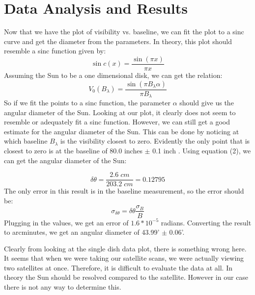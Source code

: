 \documentclass{aastex61}
\begin{document}
\section{Data Analysis and Results}
Now that we have the plot of visibility vs. baseline, we can fit the plot to a sinc curve and get the diameter from the parameters. In theory, this plot should resemble a sinc function given by:
\begin{equation}
\sin\textit{c}(x) = \frac{\sin(\pi x)}{\pi x}
\end{equation}
Assuming the Sun to be a one dimensional disk, we can get the relation:
\begin{equation}
V_{0}(B_{\lambda}) = \frac{\sin(\pi B_{\lambda} \alpha)}{\pi B_{\lambda}}
\end{equation}
So if we fit the points to a sinc function, the parameter $\alpha$ should give us the angular diameter of the Sun. Looking at our plot, it clearly does not seem to resemble or adequately fit a sinc function. However, we can still get a good estimate for the angular diameter of the Sun. This can be done by noticing at which baseline $B_{\lambda}$ is the visibility closest to zero. Evidently the only point that is closest to zero is at the baseline of 80.0 inches $\pm$ 0.1 inch . Using equation (2), we can get the angular diameter of the Sun:

\begin{equation}
	\delta\theta = \frac{2.6 \; \textit{cm}}{203.2 \; \textit{cm}} = 0.12795
\end{equation}
The only error in this result is in the baseline measurement, so the error should be:
\begin{equation}
      \sigma_{\delta\theta} = \delta\theta  \frac{\sigma_{B}}{B}
\end{equation}
Plugging in the values, we get an error of $1.6 * 10^{-5}$ radians. Converting the result to arcminutes, we get an angular diameter of 43.99' $\pm$ 0.06'. 

Clearly from looking at the single dish data plot, there is something wrong here. It seems that when we were taking our satellite scans, we were actually viewing two satellites at once. Therefore, it is difficult to evaluate the data at all. In theory the Sun should be resolved compared to the satellite. However in our case there is not any way to determine this. 
\end{document}

